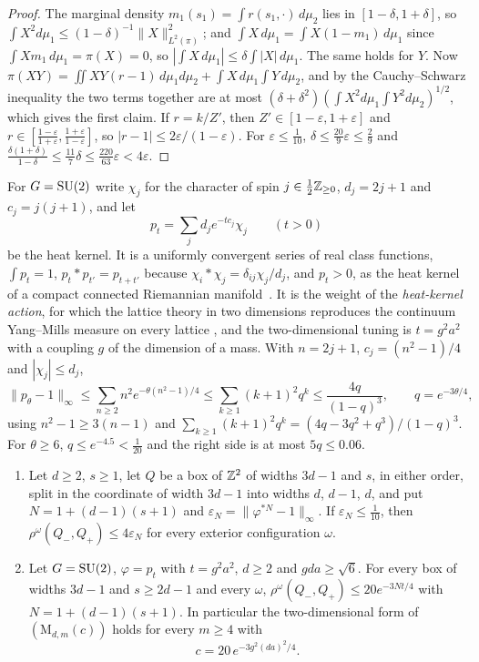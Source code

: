 \begin{proof}
The marginal density $m_1(s_1)=\int r(s_1,\cdot)\,d\mu_2$ lies in $[1-\delta,1+
\delta]$, so $\int X^2d\mu_1\le(1-\delta)^{-1}\|X\|^2_{L^2(\pi)}$; and $\int X\,
d\mu_1=\int X(1-m_1)\,d\mu_1$ since $\int Xm_1\,d\mu_1=\pi(X)=0$, so $|\int X\,
d\mu_1|\le\delta\int|X|\,d\mu_1$. The same holds for $Y$. Now $\pi(XY)=\iint XY
(r-1)\,d\mu_1d\mu_2+\int X\,d\mu_1\int Y\,d\mu_2$, and by the Cauchy--Schwarz
inequality the two terms together are at most $(\delta+\delta^2)(\int X^2d\mu_1
\int Y^2d\mu_2)^{1/2}$, which gives the first claim. If $r=k/Z'$, then $Z'\in
[1-\varepsilon,1+\varepsilon]$ and $r\in[\frac{1-\varepsilon}{1+\varepsilon},
\frac{1+\varepsilon}{1-\varepsilon}]$, so $|r-1|\le2\varepsilon/(1-\varepsilon)$.
For $\varepsilon\le\frac1{10}$, $\delta\le\frac{20}9\varepsilon\le\frac29$ and
$\frac{\delta(1+\delta)}{1-\delta}\le\frac{11}7\delta\le\frac{220}{63}
\varepsilon<4\varepsilon$.
\end{proof}

For $G=\mathrm{SU}(2)$ write $\chi_j$ for the character of spin $j\in\frac12\mathbb{Z}_{\ge0}$,
$d_j=2j+1$ and $c_j=j(j+1)$, and let
\[
p_t=\sum_jd_je^{-tc_j}\chi_j\qquad(t>0)
\]
be the heat kernel. It is a uniformly convergent series of real class
functions, $\int p_t=1$, $p_t*p_{t'}=p_{t+t'}$ because $\chi_i*\chi_j=
\delta_{ij}\chi_j/d_j$, and $p_t>0$, as the heat kernel of a compact connected
Riemannian manifold~\cite[Chs.~7--8]{Gri09}. It is the weight of the
\emph{heat-kernel action}, for which the lattice theory in two dimensions
reproduces the continuum Yang--Mills measure on every lattice
\cite{GKS89,Dri89,Lev03}, and the two-dimensional tuning is $t=g^2a^2$ with a
coupling $g$ of the dimension of a mass. With $n=2j+1$, $c_j=(n^2-1)/4$ and
$|\chi_j|\le d_j$,
\begin{equation}\label{eq:hk}
\|p_\theta-1\|_\infty\le\sum_{n\ge2}n^2e^{-\theta(n^2-1)/4}\le\sum_{k\ge1}
(k+1)^2q^k\le\frac{4q}{(1-q)^3},\qquad q=e^{-3\theta/4},
\end{equation}
using $n^2-1\ge3(n-1)$ and $\sum_{k\ge1}(k+1)^2q^k=(4q-3q^2+q^3)/(1-q)^3$. For
$\theta\ge6$, $q\le e^{-4.5}<\frac1{20}$ and the right side is at most $5q\le
0.06$.

\begin{theorem}\label{thm:twod}
\leavevmode
\begin{enumerate}[label=\textup{(\roman*)},leftmargin=*]
\item Let $d\ge2$, $s\ge1$, let $Q$ be a box of $\mathbb{Z}^2$ of widths $3d-1$ and $s$,
in either order, split in the coordinate of width $3d-1$ into widths $d$,
$d-1$, $d$, and put $N=1+(d-1)(s+1)$ and $\varepsilon_N=\|\varphi^{*N}-1
\|_\infty$. If $\varepsilon_N\le\frac1{10}$, then $\rho^\omega(Q_-,Q_+)\le4
\varepsilon_N$ for every exterior configuration $\omega$.
\item Let $G=\mathrm{SU}(2)$, $\varphi=p_t$ with $t=g^2a^2$, $d\ge2$ and $gda\ge\sqrt6$.
For every box of widths $3d-1$ and $s\ge2d-1$ and every $\omega$,
$\rho^\omega(Q_-,Q_+)\le20e^{-3Nt/4}$ with $N=1+(d-1)(s+1)$. In particular the
two-dimensional form of $(\mathrm M_{d,m}(c))$ holds for every $m\ge4$ with
\[
c=20\,e^{-3g^2(da)^2/4}.
\]
\end{enumerate}
\end{theorem}


